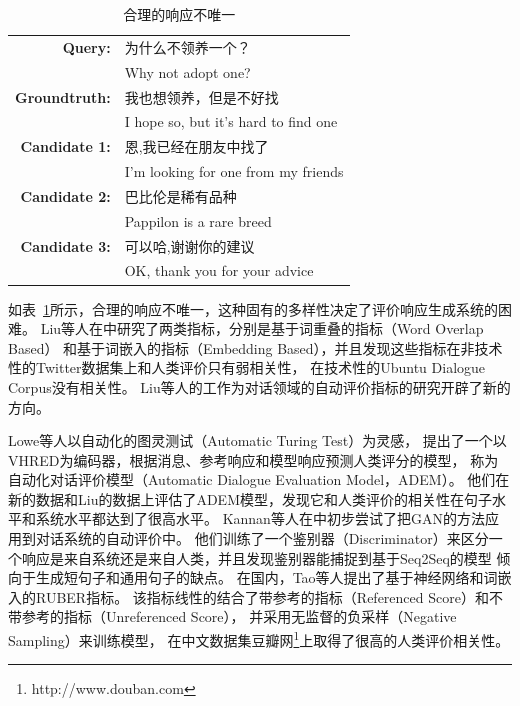 \begin{table}[H]
    \centering
    \caption{合理的响应不唯一}
    \label{tab:multiple_valid_responses}
    \begin{tabular}{rl}
        \toprule
        \textbf{Query:} & 为什么不领养一个？ \\
        & Why not adopt one? \\
        \textbf{Groundtruth:} & 我也想领养，但是不好找 \\
        & I hope so, but it's hard to find one \\
        \midrule
        \textbf{Candidate 1:} & 恩,我已经在朋友中找了 \\
        & I'm looking for one from my friends \\
        \textbf{Candidate 2:} & 巴比伦是稀有品种 \\
        & Pappilon is a rare breed \\
        \textbf{Candidate 3:} & 可以哈,谢谢你的建议 \\
        & OK, thank you for your advice \\
        \bottomrule
    \end{tabular}
\end{table}

如表~\ref{tab:multiple_valid_responses}所示，合理的响应不唯一，这种固有的多样性决定了评价响应生成系统的困难。
Liu等人在\cite{HowNot}中研究了两类指标，分别是基于词重叠的指标（Word Overlap Based）
和基于词嵌入的指标（Embedding Based），并且发现这些指标在非技术性的Twitter数据集上和人类评价只有弱相关性，
在技术性的Ubuntu Dialogue Corpus没有相关性。
Liu等人的工作为对话领域的自动评价指标的研究开辟了新的方向。

Lowe等人以自动化的图灵测试（Automatic Turing Test）为灵感，
提出了一个以VHRED为编码器，根据消息、参考响应和模型响应预测人类评分的模型，
称为自动化对话评价模型（Automatic Dialogue Evaluation Model，ADEM）。
他们在新的数据和Liu的数据上评估了ADEM模型，发现它和人类评价的相关性在句子水平和系统水平都达到了很高水平。
Kannan等人在\cite{AdverEval}中初步尝试了把GAN的方法应用到对话系统的自动评价中。
他们训练了一个鉴别器（Discriminator）来区分一个响应是来自系统还是来自人类，并且发现鉴别器能捕捉到基于Seq2Seq的模型
倾向于生成短句子和通用句子的缺点。
在国内，Tao等人提出了基于神经网络和词嵌入的RUBER指标。
该指标线性的结合了带参考的指标（Referenced Score）和不带参考的指标（Unreferenced Score），
并采用无监督的负采样（Negative Sampling）来训练模型，
在中文数据集豆瓣网\footnote{http://www.douban.com}上取得了很高的人类评价相关性。 %

